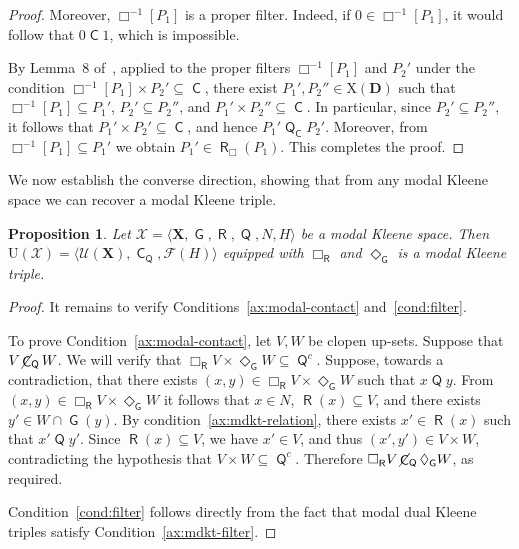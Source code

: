 \documentclass{article}
\newtheorem{proposition}[theorem]{Proposition}
\DeclareMathOperator{\con}{\mathsf{C}}
\DeclareMathOperator{\notcon}{\cancel{ \con}}
\DeclareMathOperator{\Q}{\mathsf{Q}}
\DeclareMathOperator{\G}{\mathsf{G}}
\DeclareMathOperator{\R}{\mathsf{R}}
\newcommand{\D}{\mathbf{D}}
\newcommand{\X}{\mathbf{X}}
\newcommand{\U}{\mathcal{U}}
\begin{document}
\begin{proof}
Moreover, $\Box^{-1}[P_1]$ is a proper filter. Indeed, if $0 \in \Box^{-1}[P_1]$, it would follow that $0 \con 1$, which is impossible.

By Lemma~8 of~\cite{duntsch2008distributive}, applied to the proper filters $\Box^{-1}[P_1]$ and $P_2'$ under the condition $\Box^{-1}[P_1] \times P_2' \subseteq \con$, there exist $P_1', P_2'' \in \mathrm{X}(\D)$ such that $\Box^{-1}[P_1] \subseteq P_1'$, $P_2' \subseteq P_2''$, and $P_1' \times P_2'' \subseteq \con$. In particular, since $P_2' \subseteq P_2''$, it follows that $P_1' \times P_2' \subseteq \con$, and hence $P_1'\Q_{\con} P_2'$. Moreover, from $\Box^{-1}[P_1] \subseteq P_1'$ we obtain $P_1' \in \R_\Box(P_1)$. This completes the proof.
\end{proof}

We now establish the converse direction, showing that from any modal Kleene space we can recover a modal Kleene triple.

\begin{proposition}
\label{prop:mdkt-to-triple}
Let $\mathcal{X} = \langle \X, \G, \R, \Q,N, H \rangle$ be a modal Kleene space. Then $\mathrm{U}(\mathcal{X}) = \langle \U(\X), \con_{\Q}, \mathcal{F}(H) \rangle$ equipped with $\Box_{\R}$ and $\Diamond_{\G}$ is a modal Kleene triple.
\end{proposition}
\begin{proof}
It remains to verify Conditions~\eqref{ax:modal-contact} and~\eqref{cond:filter}. 

To prove Condition~\eqref{ax:modal-contact}, let $V, W$ be clopen up-sets. Suppose that $V \notcon_{\Q} W$. We will verify that $\Box_{\R} V \times \Diamond_{\G} W \subseteq \Q^c$. Suppose, towards a contradiction, that there exists $(x,y) \in \Box_{\R} V \times \Diamond_{\G} W$ such that $x \Q y$. From $(x,y) \in \Box_{\R} V \times \Diamond_{\G} W$ it follows that $x \in N$, $\R(x) \subseteq V$, and there exists $y' \in W \cap \G(y)$. By condition~\eqref{ax:mdkt-relation}, there exists $x' \in \R(x)$ such that $x'\Q y'$. Since $\R(x) \subseteq V$, we have $x' \in V$, and thus $(x', y') \in V \times W$, contradicting the hypothesis that $V \times W \subseteq \Q^c$. Therefore $\Box_{\R} V \notcon_{\Q} \Diamond_{\G} W$, as required. 

Condition~\eqref{cond:filter} follows directly from the fact that modal dual Kleene triples satisfy Condition~\eqref{ax:mdkt-filter}.
\end{proof}
\end{document}
